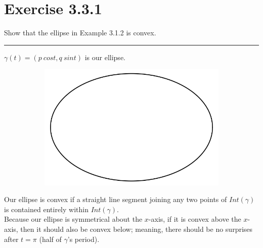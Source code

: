 \documentclass[12pt]{article}
\begin{document}
\maketitle

\section*{Exercise 3.3.1}

Show that the ellipse in Example 3.1.2 is convex.

\vspace{1cm}
\hrule
\vspace{1cm}
$\gamma(t) = (p \ cost, q \ sint)$ is our ellipse.

\begin{figure}[h!]
  \centering
      \begin{subfigure}[b]{0.5\linewidth}
    \includegraphics[width=\linewidth]{./assets/3-3-1/ellipse.png}
  \end{subfigure}
  \end{figure}
  
Our ellipse is convex if a straight line segment joining any two points of $Int(\gamma)$ is contained entirely within $Int(\gamma)$.\\

\indent
Because our ellipse is symmetrical about the $x$-axis, if it is convex above the $x$-axis, then it should also be convex below; meaning, there should be no surprises after $t = \pi$ (half of $\gamma$'s period).
\end{document}
